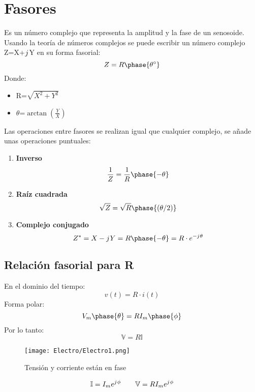 \documentclass[
	12pt, %
	fleqn, %
	a4paper, %
]{LegrandOrangeBook}
\begin{document}
\section{Fasores}
\begin{definition}[Fasor]
Es un número complejo que representa la amplitud y la fase de un senosoide.\\Usando la teoría de números complejos se puede escribir un número complejo Z=X+${j\mkern1mu}$Y en su forma fasorial:
\begin{equation}
Z=R\phase{\theta^{\circ}}
\end{equation}
Donde:
\begin{itemize}
\item R=$\sqrt{X^2+Y^2}$
\item $\theta$=$\arctan\left(\frac{Y}{X}\right)$
\end{itemize}
\end{definition}
Las operaciones entre fasores se realizan igual que cualquier complejo, se añade unas operaciones puntuales:
\begin{enumerate}
\item \textbf{Inverso}
\begin{displaymath}
\frac{1}{Z}=\frac{1}{R}\phase{-\theta}
\end{displaymath}
\item \textbf{Raíz cuadrada}
\begin{displaymath}
\sqrt{Z}=\sqrt{R}\phase{(\theta/2)}
\end{displaymath}
\item \textbf{Complejo conjugado}
\begin{displaymath}
Z^*=X-\iu Y=R\phase{-\theta}=R\cdot e^{-\iu\theta}
\end{displaymath}
\end{enumerate}
\subsection{Relación fasorial para R}
En el dominio del tiempo:
\begin{displaymath}
v(t)=R\cdot i(t)
\end{displaymath}
Forma polar:
\begin{displaymath}
V_m\phase{\theta}=RI_m\phase{\phi}
\end{displaymath}
Por lo tanto:
\begin{displaymath}
\mathbb{V}=R\mathbb{I}
\end{displaymath}
\begin{figure}[H]
\centering
\texttt{[image: Electro/Electro1.png]}
\caption{Tensión y corriente están en fase}
\end{figure}
\begin{equation*}
\mathbb{I}=I_me^{{j\mkern1mu}\phi}
\qquad
\mathbb{V}=RI_me^{{j\mkern1mu}\phi}
\end{equation*}
\end{document}
